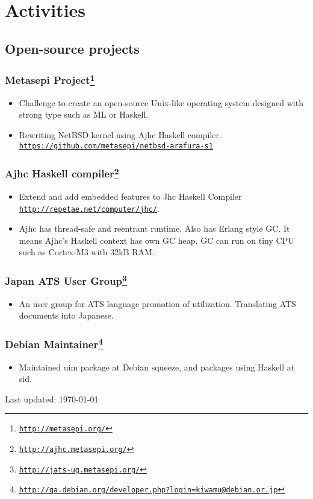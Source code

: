 \documentclass[letterpaper]{article}
\def\footer{
  \begin{center}
    \begin{footnotesize}
      Last updated: \today
    \end{footnotesize}
  \end{center}
}
\begin{document}
\section*{Activities}

\subsection*{Open-source projects}

\subsubsection*{Metasepi Project\footnote{\href{http://metasepi.org/}{\tt http://metasepi.org/}}}
\begin{itemize}
\item Challenge to create an open-source Unix-like operating system designed with strong type such as ML or Haskell.
\item Rewriting NetBSD kernel using Ajhc Haskell compiler. \href{https://github.com/metasepi/netbsd-arafura-s1}{\tt https://github.com/metasepi/netbsd-arafura-s1}
\end{itemize}

\subsubsection*{Ajhc Haskell compiler\footnote{\href{http://ajhc.metasepi.org/}{\tt http://ajhc.metasepi.org/}}}
\begin{itemize}
\item Extend and add embedded features to Jhc Haskell Compiler \href{http://repetae.net/computer/jhc/}{\tt http://repetae.net/computer/jhc/}.
\item Ajhc has thread-safe and reentrant runtime. Also has Erlang style GC. It means Ajhc's Haskell context has own GC heap. GC can run on tiny CPU such as Cortex-M3 with 32kB RAM.
\end{itemize}

\subsubsection*{Japan ATS User Group\footnote{\href{http://jats-ug.metasepi.org/}{\tt http://jats-ug.metasepi.org/}}}
\begin{itemize}
\item An user group for ATS language promotion of utilization. Translating ATS documents into Japanese.
\end{itemize}

\subsubsection*{Debian Maintainer\footnote{\href{http://qa.debian.org/developer.php?login=kiwamu@debian.or.jp}{\tt http://qa.debian.org/developer.php?login=kiwamu@debian.or.jp}}}
\begin{itemize}
\item Maintained uim package at Debian squeeze, and packages using Haskell at sid.
\end{itemize}

\bigskip
\footer
\end{document}
